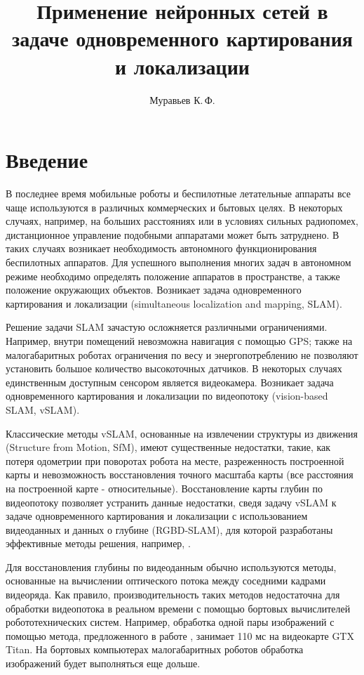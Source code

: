 \documentclass{mipt-thesis-bs}
\title{Применение нейронных сетей в задаче одновременного картирования и локализации}
\author{Муравьев К.\,Ф.}
\begin{document}
\frontmatter
\titlecontents

\mainmatter


\chapter{Введение}

В последнее время мобильные роботы и беспилотные летательные аппараты все чаще используются в различных коммерческих и бытовых целях. В некоторых случаях, например, на больших расстояниях или в условиях сильных радиопомех, дистанционное управление подобными аппаратами может быть затруднено. В таких случаях возникает необходимость автономного функционирования беспилотных аппаратов. Для успешного выполнения многих задач в автономном режиме необходимо определять положение аппаратов в пространстве, а также положение окружающих объектов. Возникает задача одновременного картирования и локализации (simultaneous localization and mapping, SLAM).

Решение задачи SLAM зачастую осложняется различными ограничениями. Например, внутри помещений невозможна навигация с помощью GPS; также на малогабаритных роботах ограничения по весу и энергопотреблению не позволяют установить большое количество высокоточных датчиков. В некоторых случаях единственным доступным сенсором является видеокамера. Возникает задача одновременного картирования и локализации по видеопотоку (vision-based SLAM, vSLAM).

Классические методы vSLAM, основанные на извлечении структуры из движения (Structure from Motion, SfM), имеют существенные недостатки, такие, как потеря одометрии при поворотах робота на месте, разреженность построенной карты и невозможность восстановления точного масштаба карты (все расстояния на построенной карте - относительные). Восстановление карты глубин по видеопотоку позволяет устранить данные недостатки, сведя задачу vSLAM к задаче одновременного картирования и локализации с использованием видеоданных и данных о глубине (RGBD-SLAM), для которой разработаны эффективные методы решения, например, \cite{labbe2011memory}.

Для восстановления глубины по видеоданным обычно используются методы, основанные на вычислении оптического потока между соседними кадрами видеоряда. Как правило, производительность таких методов недостаточна для обработки видеопотока в реальном времени с помощью бортовых вычислителей робототехнических систем. Например, обработка одной пары изображений с помощью метода, предложенного в работе \cite{ummenhofer2017demon}, занимает 110 мс на видеокарте GTX Titan. На бортовых компьютерах малогабаритных роботов обработка изображений будет выполняться еще дольше.
\end{document}
